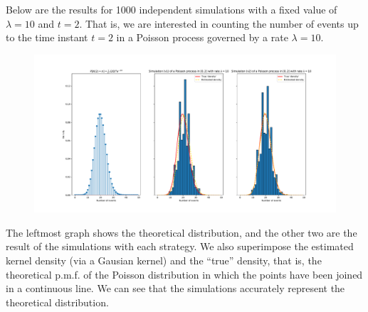 Below are the results for 1000 independent simulations with a fixed value of $\lambda = 10$ and $t=2$. That is, we are interested in counting the number of events up to the time instant $t=2$ in a Poisson process governed by a rate $\lambda=10$.

\begin{figure}[h!]
  \centering
  \includegraphics[width=\textwidth]{img/ex1.pdf}
\end{figure}

The leftmost graph shows the theoretical distribution, and the other two are the result of the simulations with each strategy. We also superimpose the estimated kernel density (via a Gausian kernel) and the ``true'' density, that is, the theoretical p.m.f. of the Poisson distribution in which the points have been joined in a continuous line. We can see that the simulations accurately represent the theoretical distribution.
